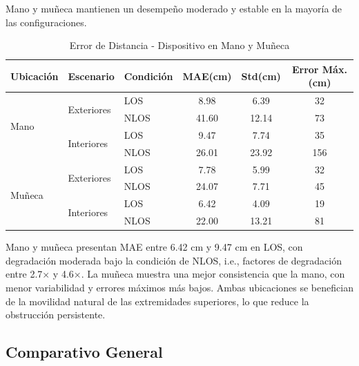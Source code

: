Mano y muñeca mantienen un desempeño moderado y estable en la mayoría de las configuraciones.
%
\begin{table}[t]
\centering
\caption{Error de Distancia - Dispositivo en Mano y Muñeca}
\label{tab:error_mano_muneca}
\begin{tabular}{lllccc}
\toprule
\rowcolor{headerblue}
\textbf{Ubicación} & \textbf{Escenario} & \textbf{Condición} & \textbf{MAE(cm)} & \textbf{Std(cm)} & \textbf{Error Máx.(cm)} \\
\midrule
\multirow{4}{*}{Mano} & \multirow{2}{*}{Exteriores}& LOS & 8.98 & 6.39 & 32 \\
&  & NLOS & 41.60 & 12.14 & 73 \\
\cmidrule{3-6}
& \multirow{2}{*}{Interiores} & LOS & 9.47 & 7.74 & 35 \\
&  & NLOS & 26.01 & 23.92 & 156 \\
\midrule
\multirow{4}{*}{Muñeca} & \multirow{2}{*}{Exteriores} & LOS & 7.78 & 5.99 & 32 \\
&  & NLOS & 24.07 & 7.71 & 45 \\
\cmidrule{3-6}
& \multirow{2}{*}{Interiores} & LOS & 6.42 & 4.09 & 19 \\
&  & NLOS & 22.00 & 13.21 & 81 \\
\bottomrule
\end{tabular}
\end{table}
%
Mano y muñeca presentan MAE entre 6.42 cm y 9.47 cm en LOS, con degradación moderada bajo la condición de NLOS, i.e., factores de degradación entre 2.7× y 4.6×. La muñeca muestra una mejor consistencia que la mano, con menor variabilidad y errores máximos más bajos. Ambas ubicaciones se benefician de la movilidad natural de las extremidades superiores, lo que reduce la obstrucción persistente.

\subsection{Comparativo General}

